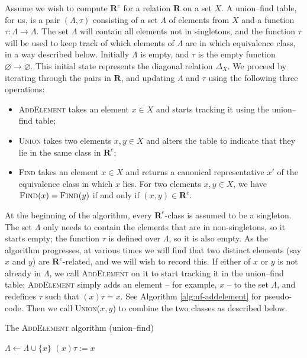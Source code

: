 Assume we wish to compute $\mathbf{R}^e$ for a relation $\mathbf{R}$ on a set
$X$.  A union--find table, for us, is a pair $(\Lambda, \tau)$ consisting of a
set $\Lambda$ of elements from $X$ and a function $\tau: \Lambda \to \Lambda$.
The set $\Lambda$ will contain all elements not in singletons, and the function
$\tau$ will be used to keep track of which elements of $\Lambda$ are in which
equivalence class, in a way described below.  Initially $\Lambda$ is empty, and
$\tau$ is the empty function $\varnothing \to \varnothing$.  This initial state
represents the diagonal relation $\Delta_X$.  We proceed by iterating through
the pairs in $\mathbf{R}$, and updating $\Lambda$ and $\tau$ using the following
three operations:
\begin{itemize}
\item \textsc{AddElement} takes an element $x \in X$ and starts tracking it
  using the union--find table;
\item \textsc{Union} takes two elements $x,y \in X$ and alters the table to
  indicate that they lie in the same class in $\mathbf{R}^e$;
\item \textsc{Find} takes an element $x \in X$ and returns a canonical
  representative $x'$ of the equivalence class in which $x$ lies.  For two
  elements $x, y \in X$, we have $\textsc{Find}(x) = \textsc{Find}(y)$ if and
  only if $(x,y) \in \mathbf{R}^e$.
\end{itemize}

At the beginning of the algorithm, every $\mathbf{R}^e$-class is assumed to be a
singleton.  The set $\Lambda$ only needs to contain the elements that are in non-singletons, so it
starts empty; the function $\tau$ is defined over $\Lambda$, so it is also empty.
As the algorithm progresses,
at various times we will find that two distinct elements (say $x$ and $y$) are
$\mathbf{R}^e$-related, and we will wish to record this.  If either of $x$ or
$y$ is not already in $\Lambda$, we call \textsc{AddElement} on it to start tracking
it in the union--find table; \textsc{AddElement} simply adds an element -- for
example, $x$ -- to the set $\Lambda$, and redefines $\tau$ such that $(x)\tau = x$.  See Algorithm
\ref{alg:uf-addelement} for pseudo-code.  Then we call \textsc{Union($x,y$)} to
combine the two classes as described below.

\begin{algorithm}
\caption{The \textsc{AddElement} algorithm (union--find)}
\label{alg:uf-addelement}
  \begin{algorithmic}[1]
      \State $\Lambda \gets \Lambda \cup \{x\}$
      \State $(x)\tau := x$
    \EndProcedure
  \end{algorithmic}
\end{algorithm}

